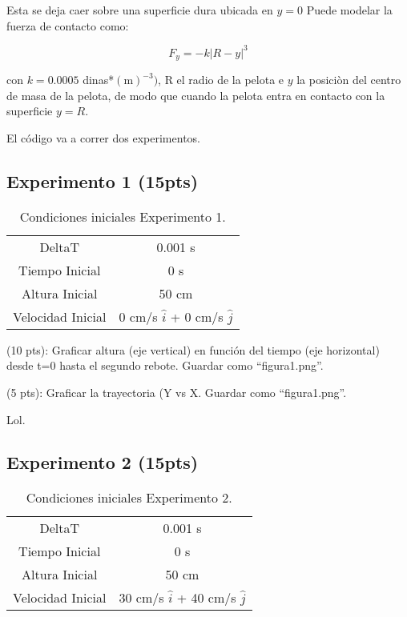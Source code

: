 \documentclass{article}
\begin{document}
Esta se deja caer sobre una superficie dura ubicada en $y=0$
Puede modelar la fuerza de contacto como:

\[ F_y =  - k |R - y |^3\]

con $k = 0.0005$ dinas*$(\mathrm{m})^{-3})$, R el radio de la pelota
e $y$ la posiciòn del centro de masa de la pelota, de modo que 
cuando la pelota entra en contacto con la superficie $y=R$.


El código va a correr dos experimentos.

\subsection*{Experimento 1 (15pts)}

\begin{table}[ht]
    \centering
    \begin{tabular}{c|c}
         DeltaT & 0.001 s \\
         Tiempo Inicial & 0 s \\
         Altura Inicial &  50 cm\\
         Velocidad Inicial & 0 cm/s $\hat{i}$ + 0 cm/s $\hat{j}$ 
    \end{tabular}
    \caption{Condiciones iniciales Experimento 1.}
    \label{tab:experimento1}
\end{table}

(10 pts): Graficar altura (eje vertical) en función del tiempo (eje horizontal) desde t=0 hasta el segundo rebote.
Guardar como ``figura1.png''.


(5 pts): Graficar la trayectoria (Y vs X. Guardar como ``figura1.png''.

Lol.

\subsection*{Experimento 2 (15pts)}

\begin{table}[ht]
    \centering
    \begin{tabular}{c|c}
         DeltaT & 0.001 s \\
         Tiempo Inicial & 0 s \\
         Altura Inicial &  50 cm\\
         Velocidad Inicial & 30 cm/s $\hat{i}$ + 40 cm/s $\hat{j}$ 
    \end{tabular}
    \caption{Condiciones iniciales Experimento 2.}
    \label{tab:experimento2}
\end{table}
\end{document}
